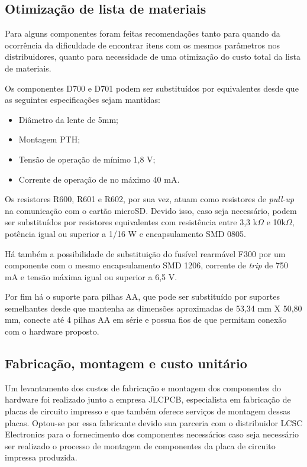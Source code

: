 \subsection{Otimização de lista de materiais}

Para alguns componentes foram feitas recomendações tanto para quando da ocorrência da dificuldade de encontrar itens com os mesmos parâmetros nos distribuidores, quanto para necessidade de uma otimização do custo total da lista de materiais.

Os componentes D700 e D701 podem ser substituídos por equivalentes desde que as seguintes especificações sejam mantidas:
    \begin{itemize}
        \item Diâmetro da lente de 5mm;
        \item Montagem PTH;
        \item Tensão de operação de mínimo 1,8 V;
        \item Corrente de operação de no máximo 40 mA.
    \end{itemize}
    
  Os resistores R600, R601 e R602, por sua vez, atuam como resistores de \textit{pull-up} na comunicação com o cartão microSD. Devido isso, caso seja necessário, podem ser substituídos por resistores equivalentes com resistência entre 3,3 k$\Omega$ e 10k$\Omega$, potência igual ou superior a 1/16 W e encapsulamento SMD 0805.
    
 Há também a possibilidade de substituição do fusível rearmável F300 por um componente com o mesmo encapsulamento SMD 1206, corrente de \textit{trip} de 750 mA e tensão máxima igual ou superior a 6,5 V.
    
Por fim há o suporte para pilhas AA, que pode ser substituído por suportes semelhantes desde que mantenha as dimensões aproximadas de 53,34 mm X 50,80 mm, conecte até 4 pilhas AA em série e possua fios de que permitam conexão com o hardware proposto.

\subsection{Fabricação, montagem e custo unitário}

Um levantamento dos custos de fabricação e montagem dos componentes do hardware foi realizado junto a empresa JLCPCB, especialista em fabricação de placas de circuito impresso e que também oferece serviços de montagem dessas placas. Optou-se por essa fabricante devido sua parceria com o distribuidor LCSC Electronics para o fornecimento dos componentes necessários caso seja necessário ser realizado o processo de montagem de componentes da placa de circuito impressa produzida.

